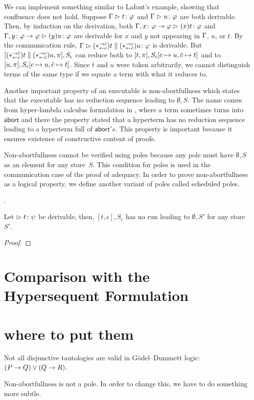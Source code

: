 We can implement something similar to Lafont's example,
showing that confluence does not hold.
Suppose $\Gamma\vartriangleright{t} \colon{\varphi}$ and $\Gamma\vartriangleright{u} \colon{\varphi}$ are both derivable.
Then, by induction on the derivation,
both $\Gamma,{x} \colon{\varphi\rightarrow\varphi}\vartriangleright{(x)t} \colon{\varphi}$
and $\Gamma,{y} \colon{\varphi\rightarrow\varphi}\vartriangleright{(y)u} \colon{\varphi}$ are derivable
for $x$ and $y$ not appearing in $\Gamma$, $u$, or $t$.
By the communication rule,
$\Gamma\vartriangleright{(\ast^{\rightarrow {\bar{c}}}_{\leftarrow{c}})t\parallel(\ast^{\rightarrow {c}}_{\leftarrow{\bar{c}}})u} \colon{\varphi}$ is derivable.
But $[(\ast^{\rightarrow {\bar{c}}}_{\leftarrow{c}})t\parallel (\ast^{\rightarrow {c}}_{\leftarrow{\bar{c}}})u,
\pi],S_\epsilon$
can reduce both to $[t,\pi], S_\epsilon[c\mapsto u, \bar{c}\mapsto t]$
and to $[u,\pi], S_\epsilon[c\mapsto u,\bar{c}\mapsto t]$.
Since $t$ and $u$ were taken arbitrarily, we cannot distinguish terms
of the same type if we equate a term with what it reduces to.


Another important property of an executable is
non-abortfullness
which states that the executable has no reduction sequence leading to
$\emptyset,S$.
The name comes from hyper-lambda calculus formulation in ,
where a term sometimes turns into $\mathsf{abort}$ and there the property
stated that a hyperterm has no reduction sequence leading to a hyperterm
full of $\mathsf{abort}'s$.
This property is important because it ensures existence of
constructive content of proofs.

Non-abortfullness cannot be verified using poles
because any pole must have $\emptyset,S$ as an element for
any store~$S$.
This condition for poles is used in the
communication case of the proof of adequacy.
In order to prove non-abortfullness as a logical property,
we define another variant of poles called scheduled poles.


.


\newcommand{\sche}{\sqsubseteq}

\begin{proposition}
Let $\vartriangleright{t} \colon{\psi}$ be derivable, then,
 $[t,\epsilon], S_\epsilon$ has no run leading to $\emptyset, S'$ for
 any store $S'$.
\end{proposition}
\begin{proof}
\end{proof}



\section{Comparison with the Hypersequent Formulation}


\section*{where to put them}

Not all disjunctive tautologies are valid in G\"odel--Dummett logic:
$(P\rightarrow Q)\lor(Q\rightarrow R)$.

Non-abortfullness is not a pole.
In order to change this, we have to do something more subtle.
